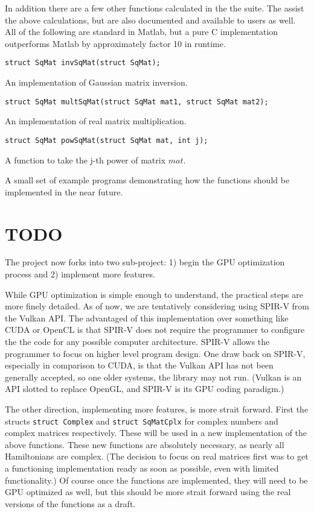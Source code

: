 \documentclass{article}
\theoremstyle{exampstyle} \newtheorem*{remark}{Remark}
\newcommand{\1}{\mathds{1}}
\begin{document}
In addition there are a few other functions calculated in the the suite. The assist the above calculations, but are also documented and available to users as well. All of the following are standard in Matlab, but a pure C implementation outperforms Matlab by approximately factor 10 in runtime.
\newline

\texttt{struct SqMat invSqMat(struct SqMat);}

An implementation of Gaussian matrix inversion.
\newline

\texttt{struct SqMat multSqMat(struct SqMat mat1, struct SqMat mat2);}

An implementation of real matrix multiplication.
\newline

\texttt{struct SqMat powSqMat(struct SqMat mat, int j);}

A function to take the j-th power of matrix $mat$.
\newline

A small set of example programs demonstrating how the functions should be implemented in the near future.

\section{TODO}

The project now forks into two sub-project: 1) begin the GPU optimization process and 2) implement more features.

While GPU optimization is simple enough to understand, the practical steps are more finely detailed. As of now, we are tentatively considering using SPIR-V from the Vulkan API. The advantaged of this implementation over something like CUDA or OpenCL is that SPIR-V does not require the programmer to configure the the code for any possible computer architecture. SPIR-V allows the programmer to focus on higher level program design. One draw back on SPIR-V, especially in comparison to CUDA, is that the Vulkan API has not been generally accepted, so one older systems, the library may not run. (Vulkan is an API slotted to replace OpenGL, and SPIR-V is its GPU coding paradigm.)

The other direction, implementing more features, is more strait forward. First the structs \texttt{struct Complex} and \texttt{struct SqMatCplx} for complex numbers and complex matrices respectively. These will be used in a new implementation of the above functions. These new functions are absolutely necessary, as nearly all Hamiltonians are complex. (The decision to focus on real matrices first was to get a functioning implementation ready as soon as possible, even with limited functionality.) Of course once the functions are implemented, they will need to be GPU optimized as well, but this should be more strait forward using the real versions of the functions as a draft.
\end{document}

